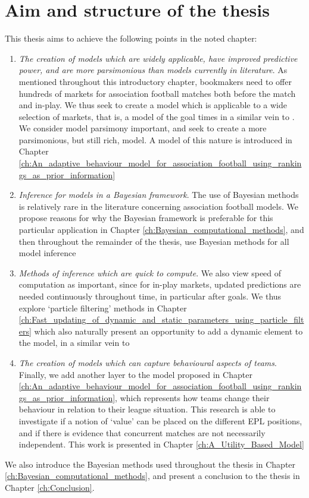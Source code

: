 \section{Aim and structure of the thesis}

This thesis aims to achieve the following points in the noted chapter:
\begin{enumerate}
\item \textit{The creation of models which are widely applicable, have improved predictive power, and are more parsimonious than
models currently in literature}. As mentioned throughout this introductory chapter, bookmakers need to offer hundreds of
markets for association football matches both before the match and in-play. We thus seek to create a model which is
applicable to a wide selection of markets, that is, a model of the goal times in a similar vein to
\cite{DixonRobinson1998}. We consider model parsimony important, and seek to create a more parsimonious, but still rich,
model. A model of this nature is introduced in Chapter
\ref{ch:An_adaptive_behaviour_model_for_association_football_using_rankings_as_prior_information}

\item \textit{Inference for models in a Bayesian framework}. The use of Bayesian methods is relatively rare in the
literature concerning association football models. We propose reasons for why the Bayesian framework is preferable for
this particular application in Chapter \ref{ch:Bayesian_computational_methods}, and then throughout the remainder of the
thesis, use Bayesian methods for all model inference

\item \textit{Methods of inference which are quick to compute}. We also view speed of computation as important, since
for in-play markets, updated predictions are needed continuously throughout time, in particular after goals. We thus
explore `particle filtering' methods in Chapter
\ref{ch:Fast_updating_of_dynamic_and_static_parameters_using_particle_filters} which also naturally present an
opportunity to add a dynamic element to the model, in a similar vein to \cite{Owen2011}

\item \textit{The creation of models which can capture behavioural aspects of teams}. Finally, we add another layer to
the model proposed in Chapter
\ref{ch:An_adaptive_behaviour_model_for_association_football_using_rankings_as_prior_information}, which represents how
teams change their behaviour in relation to their league situation. This research is able to investigate if a notion of
`value' can be placed on the different \gls{EPL} positions, and if there is evidence that concurrent matches are not
necessarily independent. This work is presented in Chapter \ref{ch:A_Utility_Based_Model}
\end{enumerate}
We also introduce the Bayesian methods used throughout the thesis in Chapter \ref{ch:Bayesian_computational_methods},
and present a conclusion to the thesis in Chapter \ref{ch:Conclusion}.

